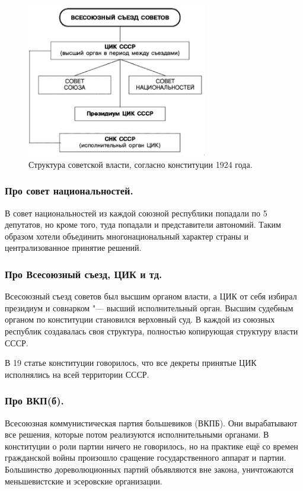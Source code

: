 \begin{figure}[H]
    \centering
    \includegraphics[width=0.7\textwidth]{картинки/Структура_власти_1924.jpeg}
    \caption{Структура советской власти, согласно конституции 1924 года.}
\end{figure}

\subsubsection{\textbf{Про совет национальностей.}}

В совет национальностей из каждой союзной республики попадали по 5 депутатов, но кроме того, туда попадали и представители автономий. Таким образом хотели объединить многонациональный характер страны и централизованное принятие решений.

\subsubsection{\textbf{Про Всесоюзный съезд, ЦИК и тд.}}

Всесоюзный съезд советов был высшим органом власти, а ЦИК от себя избирал президиум и совнарком "--- высший исполнительный орган. Высшим судебным органом по конституции становился верховный суд. В каждой из союзных республик создавалась своя структура, полностью копирующая структуру власти СССР.

В 19 статье конституции говорилось, что все декреты принятые ЦИК исполнялись на всей территории СССР.

\subsubsection{\textbf{Про ВКП(б).}}

Всесоюзная коммунистическая партия большевиков (ВКПБ). Они вырабатывают все решения, которые потом реализуются исполнительными органами. В конституции о роли партии ничего не говорилось, но на практике ещё со времен гражданской войны произошло сращение государственного аппарат и партии. Большинство дореволюционных партий объявляются вне закона, уничтожаются меньшевистские и эсеровские организации.

